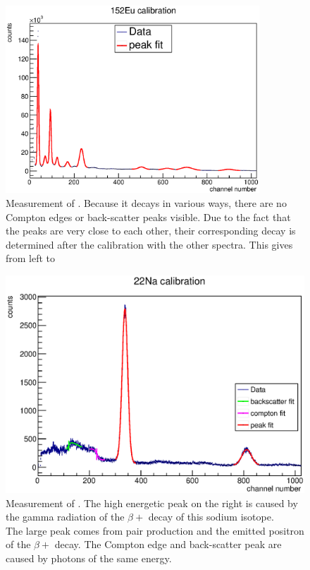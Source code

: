 \documentclass{article}
\begin{document}
\begin{figure}[H]
       \centering
        \includegraphics[width=0.85\textwidth]{Graphen/calibrate/uncalib_spectra/152Eu.eps}
        \caption{Measurement of . Because it decays in various ways, there are no Compton edges or back-scatter peaks visible. Due to the fact that the peaks are very close to each other, their corresponding decay is determined after the calibration with the other spectra. This gives from left to }
\end{figure}
\begin{figure}[H]
       \centering
        \includegraphics[width=\textwidth]{Graphen/calibrate/uncalib_spectra/22Na.eps}
        \caption{Measurement of . The high energetic peak on the right is caused by the gamma radiation of the $\beta+$ decay of this sodium isotope.\\
        The large peak comes from pair production and the emitted positron of the $\beta+$ decay. The Compton edge and back-scatter peak are caused by photons of the same energy.}
\end{figure}
\end{document}
